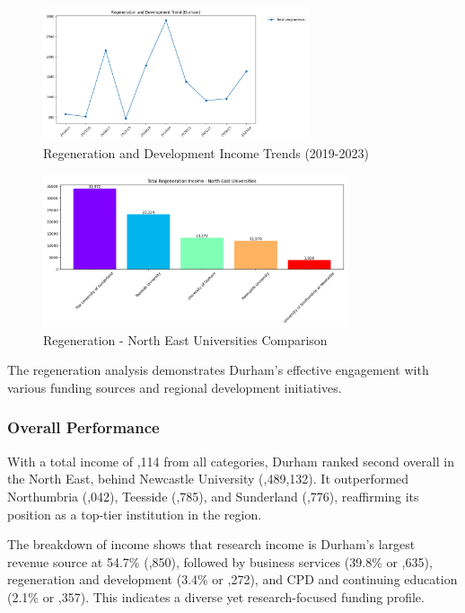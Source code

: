 \documentclass[journal,onecolumn, 10pt,draftclsnofoot]{IEEEtran}
\begin{document}
\begin{figure}[h]
\centering
\includegraphics[width=0.7\textwidth]{Fig/figure15.regeneration_time_trend.png}
\caption{Regeneration and Development Income Trends (2019-2023)}
\label{fig:regeneration-time-trend}
\end{figure}

\begin{figure}[h]
\centering
\includegraphics[width=0.8\textwidth]{Fig/figure16.regeneration_ne_comparison.png}
\caption{Regeneration - North East Universities Comparison}
\label{fig:regeneration-ne-comparison}
\end{figure}

The regeneration analysis demonstrates Durham's effective engagement with various funding sources and regional development initiatives.

\subsubsection{Overall Performance}

With a total income of ,114 from all categories, Durham ranked second overall in the North East, behind Newcastle University (,489,132). It outperformed Northumbria (,042), Teesside (,785), and Sunderland (,776), reaffirming its position as a top-tier institution in the region.

The breakdown of income shows that research income is Durham's largest revenue source at 54.7\% (,850), followed by business services (39.8\% or ,635), regeneration and development (3.4\% or ,272), and CPD and continuing education (2.1\% or ,357). This indicates a diverse yet research-focused funding profile.
\end{document}
